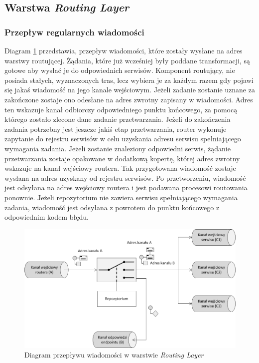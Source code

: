 \subsection{Warstwa \textit{Routing Layer}}

\subsubsection*{Przepływ regularnych wiadomości}
Diagram \ref{fig:routing_layer_project} przedstawia, przepływ wiadomości, które zostały wysłane na adres warstwy routującej. Żądania, które już wcześniej były poddane transformacji, są gotowe aby wysłać je do odpowiednich serwisów. Komponent routujący, nie posiada stałych, wyznaczonych tras, lecz wybiera je za każdym razem gdy pojawi się jakaś wiadomość na jego kanale wejściowym. Jeżeli zadanie zostanie uznane za zakończone zostaje ono odesłane na adres zwrotny zapisany w wiadomości. Adres ten wskazuje kanał odbiorczy odpowiedniego punktu końcowego, za pomocą którego zostało zlecone dane zadanie przetwarzania. Jeżeli do zakończenia zadania potrzebny jest jeszcze jakiś etap przetwarzania, router wykonuje zapytanie do rejestru serwisów w celu uzyskania adresu serwisu spełniającego wymagania zadania. Jeżeli zostanie znaleziony odpowiedni serwis, żądanie przetwarzania zostaje opakowane w dodatkową kopertę, której adres zwrotny wskazuje na kanał wejściowy routera. Tak przygotowana wiadomość zostaje wysłana na adres uzyskany od rejestru serwisów. Po przetworzeniu, wiadomość jest odsyłana na adres wejściowy routera i jest podawana procesowi routowania ponownie. Jeżeli repozytorium nie zawiera serwisu spełniającego wymagania zadania, wiadomość jest odsyłana z powrotem do punktu końcowego z odpowiednim kodem błędu. 

\begin{figure}[!h]
	\centering
	\includegraphics[scale=0.55]{router_flow.png}
	\caption{Diagram przepływu wiadomości w warstwie \textit{Routing Layer}}\label{fig:routing_layer_project}
\end{figure}

